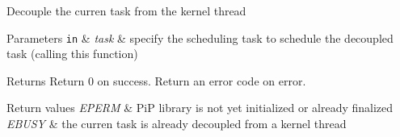 Decouple the curren task from the kernel thread


\begin{DoxyParams}[1]{Parameters}
\mbox{\tt in}  & {\em task} & specify the scheduling task to schedule the decoupled task (calling this function)\\
\hline
\end{DoxyParams}
\begin{DoxyReturn}{Returns}
Return 0 on success. Return an error code on error. 
\end{DoxyReturn}

\begin{DoxyRetVals}{Return values}
{\em E\-P\-E\-R\-M} & Pi\-P library is not yet initialized or already finalized \\
\hline
{\em E\-B\-U\-S\-Y} & the curren task is already decoupled from a kernel thread \\
\hline
\end{DoxyRetVals}
